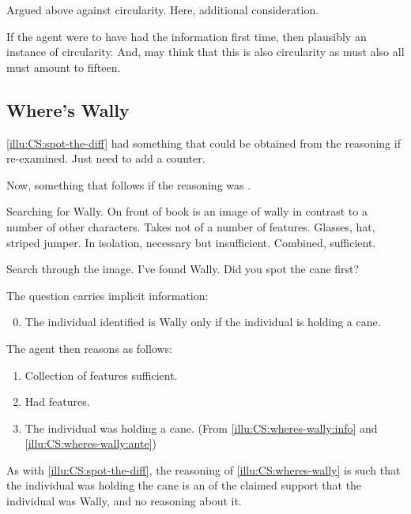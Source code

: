 \begin{note}
  Argued above against circularity.
  Here, additional consideration.

  If the agent were to have had the information first time, then plausibly an instance of circularity.
  And, may think that this is also circularity as must also all must amount to fifteen.
\end{note}

\subsection{Where's Wally}

\begin{note}
  \autoref{illu:CS:spot-the-diff} had something that could be obtained from the reasoning if re-examined.
  Just need to add a counter.

  Now, something that follows if the reasoning was \nmom{}.
\end{note}

\begin{note}
  \begin{illustration}
    \label{illu:CS:wheres-wally}
    Searching for Wally.
    On front of book is an image of wally in contrast to a number of other characters.
    Takes not of a number of features.
    Glasses, hat, striped jumper.
    In isolation, necessary but insufficient.
    Combined, sufficient.

    Search through the image.
    I've found Wally.
    Did you spot the cane first?

    The question carries implicit information:
    \begin{enumerate}[label=\arabic*., ref=(I\ref{illu:CS:wheres-wally}.\arabic*)]
      \setcounter{enumi}{-1}
    \item\label{illu:CS:wheres-wally:info} The individual identified is Wally only if the individual is holding a cane.
    \end{enumerate}

    The agent then reasons as follows:

    \begin{enumerate}[label=\arabic*., ref=(I\ref{illu:CS:wheres-wally}.\arabic*), resume]
    \item Collection of features sufficient.
    \item\label{illu:CS:wheres-wally:ante} Had features.
    \item The individual was holding a cane. \hfill (From \ref{illu:CS:wheres-wally:info} and \ref{illu:CS:wheres-wally:ante})
    \end{enumerate}
  \end{illustration}

  As with \autoref{illu:CS:spot-the-diff}, the reasoning of \autoref{illu:CS:wheres-wally} is such that the individual was holding the cane is an \expec{} of the claimed support that the individual was Wally, and no reasoning about it.
\end{note}

